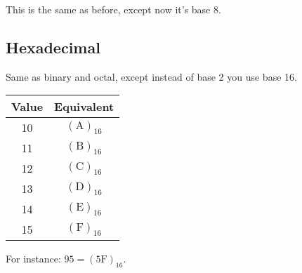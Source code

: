 This is the same as before, except now it's base 8.

\subsection{Hexadecimal}

Same as binary and octal, except instead of base 2 you use base 16.

\begin{tabular}{c c}
  \hline
  Value & Equivalent \\
  \hline
  10 & $(\text{A})_{16}$ \\
  11 & $(\text{B})_{16}$ \\
  12 & $(\text{C})_{16}$ \\
  13 & $(\text{D})_{16}$ \\
  14 & $(\text{E})_{16}$ \\
  15 & $(\text{F})_{16}$ \\
\end{tabular}

For instance: $95 = (5\text{F})_{16}$.
